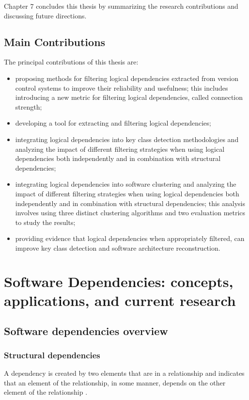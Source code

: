 Chapter 7 concludes this thesis by summarizing the research contributions and discussing future directions.

\section{Main Contributions}

\hspace{4em}The principal contributions of this thesis are:  
\begin{itemize}  
    \item proposing methods for filtering logical dependencies extracted from version control systems to improve their reliability and usefulness; this includes introducing a new metric for filtering logical dependencies, called connection strength;  
    \item developing a tool for extracting and filtering logical dependencies;  
    \item integrating logical dependencies into key class detection methodologies and analyzing the impact of different filtering strategies when using logical dependencies both independently and in combination with structural dependencies;  
    \item integrating logical dependencies into software clustering and analyzing the impact of different filtering strategies when using logical dependencies both independently and in combination with structural dependencies; this analysis involves using three distinct clustering algorithms and two evaluation metrics to study the results;  
    \item providing evidence that logical dependencies when appropriately filtered, can improve key class detection and software architecture reconstruction.  
\end{itemize}  


\chapter{Software Dependencies: concepts, applications, and current research}
\label{dep}

\section{Software dependencies overview}

\subsection{Structural dependencies}
\hspace{4em} A dependency is created by two elements that are in a relationship and indicates that an element of the relationship, in some manner, depends on the other element of the relationship \cite{Booch:2004:OAD:975416, Cataldo2009SoftwareDW}.


